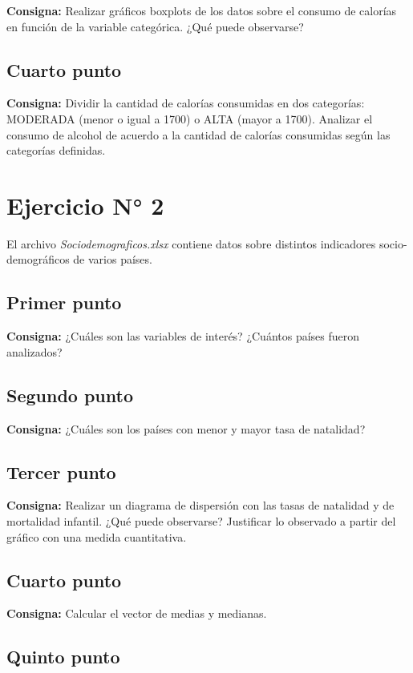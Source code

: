 \documentclass{article} %
\begin{document}
\textbf{Consigna:} Realizar gráficos boxplots de los datos sobre el consumo de calorías en función de la variable categórica. ¿Qué puede observarse?


\subsection{Cuarto punto}

\textbf{Consigna:} Dividir la cantidad de calorías consumidas en dos categorías: MODERADA (menor o igual a 1700) o ALTA (mayor a 1700). Analizar el consumo de alcohol de acuerdo a la cantidad de calorías consumidas según las categorías definidas.

\section{Ejercicio N° 2}
El archivo \textit{Sociodemograficos.xlsx} contiene datos sobre distintos indicadores socio-demográficos de varios países.

\subsection{Primer punto}

\textbf{Consigna:} ¿Cuáles son las variables de interés? ¿Cuántos países fueron analizados?

\subsection{Segundo punto}

\textbf{Consigna:} ¿Cuáles son los países con menor y mayor tasa de natalidad?


\subsection{Tercer punto}

\textbf{Consigna:} Realizar un diagrama de dispersión con las tasas de natalidad y de mortalidad infantil. ¿Qué puede observarse? Justificar lo observado a partir del gráfico con una medida cuantitativa.


\subsection{Cuarto punto}

\textbf{Consigna:} Calcular el vector de medias y medianas.

\subsection{Quinto punto}
\end{document}
